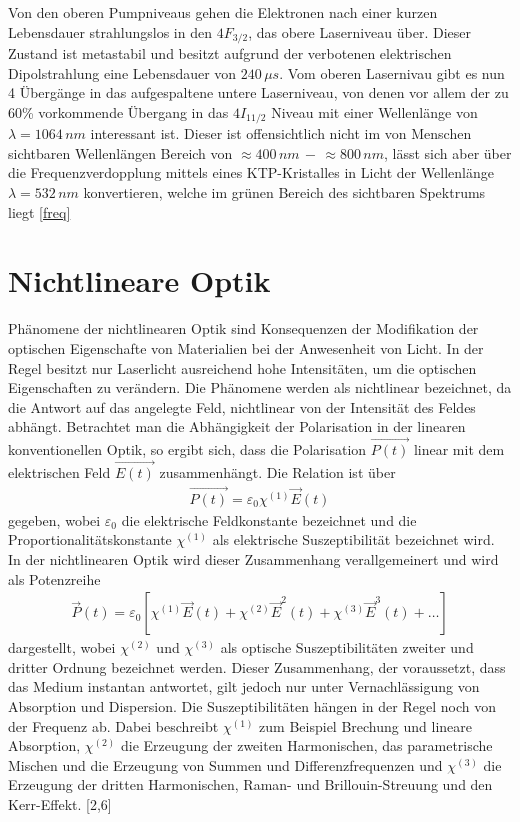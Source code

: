 \documentclass[twoside,colorback,accentcolor=tud4c,11pt]{tudreport}
\begin{document}
Von den oberen Pumpniveaus gehen die Elektronen nach einer kurzen Lebensdauer strahlungslos in den $4F_{3/2}$, das obere Laserniveau über. Dieser Zustand ist metastabil und besitzt aufgrund der verbotenen elektrischen Dipolstrahlung eine Lebensdauer von $240\,\si{\mu s}$. Vom oberen Lasernivau gibt es nun 4 Übergänge in das aufgespaltene untere Laserniveau, von denen vor allem der zu 60\% vorkommende Übergang in das $4I_{11/2}$ Niveau mit einer Wellenlänge von $\lambda=1064\,\si{nm}$ interessant ist. Dieser ist offensichtlich nicht im von Menschen sichtbaren Wellenlängen Bereich von $\approx 400\,\si{nm}\,-\,\approx 800\,\si{nm}$, lässt sich aber über die Frequenzverdopplung mittels eines KTP-Kristalles in Licht der Wellenlänge $\lambda=532\,\si{nm}$ konvertieren, welche im grünen Bereich des sichtbaren Spektrums liegt \ref{freq} \cite{anl,laser2,laser3}
\section{Nichtlineare Optik}
Phänomene der nichtlinearen Optik sind Konsequenzen der Modifikation der optischen Eigenschafte von Materialien bei der Anwesenheit von Licht. In der Regel besitzt nur Laserlicht ausreichend hohe Intensitäten, um die optischen Eigenschaften zu verändern. Die Phänomene werden als nichtlinear bezeichnet, da die Antwort auf das angelegte Feld, nichtlinear von der Intensität des Feldes abhängt. Betrachtet man die Abhängigkeit der Polarisation in der linearen konventionellen Optik, so ergibt sich, dass die Polarisation $\vec{P(t)}$ linear mit dem elektrischen Feld $\vec{E(t)}$ zusammenhängt. Die Relation ist über 
\begin{align*}
\vec{P(t)}=\varepsilon_0\chi^{(1)}\vec{E}(t)
\end{align*}
gegeben, wobei $\varepsilon_0$ die elektrische Feldkonstante bezeichnet und die Proportionalitätskonstante $\chi^{(1)}$ als elektrische Suszeptibilität bezeichnet wird. In der nichtlinearen Optik wird dieser Zusammenhang verallgemeinert und wird als Potenzreihe
\begin{align*}
\vec{P}(t)=\varepsilon_0 \left[ \chi^{(1)} \vec{E}(t) + \chi^{(2)} \vec{E}^2(t) +  \chi^{(3)}\vec{E}^3(t) + \dots \right]
\end{align*} 
dargestellt, wobei $\chi^{(2)}$ und $\chi^{(3)}$ als optische Suszeptibilitäten zweiter und dritter Ordnung bezeichnet werden. Dieser Zusammenhang, der voraussetzt, dass das Medium instantan antwortet, gilt jedoch nur unter Vernachlässigung von Absorption und Dispersion. Die Suszeptibilitäten hängen in der Regel noch von der Frequenz ab. Dabei beschreibt $\chi^{(1)}$ zum Beispiel Brechung und lineare Absorption, $\chi^{(2)}$ die Erzeugung der zweiten Harmonischen, das parametrische Mischen und die Erzeugung von Summen und Differenzfrequenzen und $\chi^{(3)}$ die Erzeugung der dritten Harmonischen, Raman- und Brillouin-Streuung und den Kerr-Effekt. [2,6]
\end{document}
